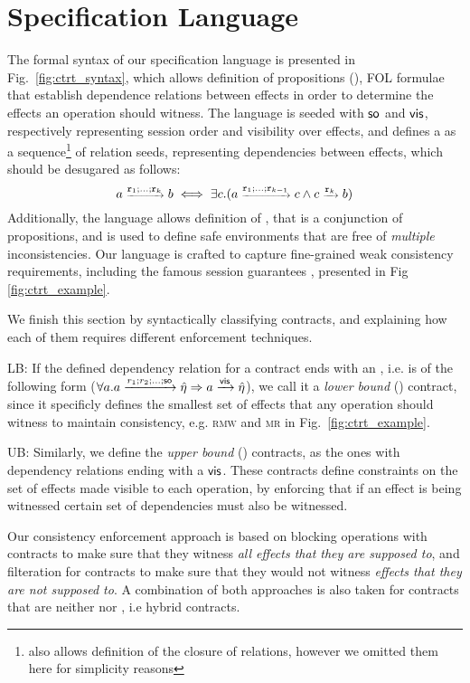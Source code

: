 \section {Specification Language} 
\label{sec:ctrt_language}

The formal syntax of our specification language is presented in
Fig.~\ref{fig:ctrt_syntax}, which allows definition of propositions
(\propS{}), FOL formulae that 
establish dependence relations between effects in order to determine
the effects an operation should witness.
The language is seeded with ${\textsf{so}}$ and ${\normalfont \textsf{vis}}$, respectively representing session
order and visibility over effects, 
and defines a \relationS{} as a sequence\footnote{\tool also allows
definition of the closure of relations, however we omitted them here for
simplicity reasons} of relation seeds, representing dependencies between effects,  
which should be desugared as
follows:
\begin{equation} \scriptsize
\label{eq:desugar}
a \xrightarrow{\mathtt{r}_1;...;\mathtt{r}_k} b \iff \exists c. (a
\xrightarrow{\mathtt{r}_1;...;\mathtt{r}_{k-1}} c
\wedge c \xrightarrow {\mathtt{r}_k} b)
\end{equation}
Additionally, the language allows definition of \specS{}, that is a
conjunction of propositions, and is used to define safe environments that are 
free of \emph{multiple} inconsistencies. 
Our language is crafted to capture fine-grained weak consistency
requirements, including the famous session guarantees \cite{terry}, presented
in Fig \ref{fig:ctrt_example}.

%
%

We finish this section by syntactically classifying 
contracts, and explaining how each of them requires different
enforcement techniques.
\begin{description}
\item {\textsf LB}: If the defined dependency relation for a contract ends with an \soZ, i.e. is of
the following form ({\scriptsize $\forall a. a
\xrightarrow{r_1;r_2;...;{\textsf{so}}} \hat{\eta}
\Rightarrow a \xrightarrow{{\normalfont \textsf{vis}}} \hat{\eta}$}), we call it a \emph{lower
bound} (\LB{}) contract, since it specificly defines the smallest set of
effects that any operation should witness to maintain consistency, e.g.
\textsc{rmw} and \textsc{mr} in Fig.~\ref{fig:ctrt_example}.

\item {\textsf UB}: Similarly, we define the \emph{upper bound} (\UB{})
contracts, as the ones with dependency relations ending with a ${\normalfont \textsf{vis}}$.
These contracts define constraints on the set of effects made visible
to each operation, by enforcing that if an effect is being witnessed
certain set of dependencies must also be witnessed.
\end{description}
Our consistency enforcement approach is based on blocking operations with \LB{}
contracts to make sure that they witness \emph{all effects that they are
supposed to}, and filteration for \UB{} contracts to make sure that they
would not witness \emph{effects that they are not supposed
to}. A combination of both approaches is also taken for contracts that are
neither  \LB{} nor \UB{}, i.e hybrid contracts.

